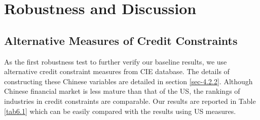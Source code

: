 \chapter{Robustness and Discussion}\label{sec-6.robustness}

\section{Alternative Measures of Credit Constraints}

As the first robustness test to further verify our baseline results, we use alternative credit constraint measures from CIE database. The details of constructing these Chinese variables are detailed in section \ref{sec-4.2.2}. Although Chinese financial market is less mature than that of the US, the rankings of industries in credit constraints are comparable. Our results are reported in Table \ref{tab6.1} which can be easily compared with the results using US measures.

